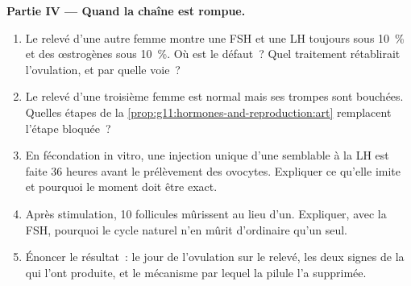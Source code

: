 \begin{problem}
\medskip
\noindent\textbf{Partie IV --- Quand la chaîne est rompue.}
\begin{enumerate}[resume]
  \item Le relevé d'une autre femme montre une FSH et une LH toujours
        sous 10~\% et des œstrogènes sous 10~\%. Où est le défaut~?
        Quel traitement rétablirait l'ovulation, et par quelle voie~?
  \item Le relevé d'une troisième femme est normal mais ses trompes
        sont bouchées. Quelles étapes de la
        \cref{prop:g11:hormones-and-reproduction:art} remplacent
        l'étape bloquée~?
  \item En fécondation in vitro, une injection unique d'une 
        semblable à la LH est faite 36 heures avant le prélèvement des
        ovocytes. Expliquer ce qu'elle imite et pourquoi le moment doit
        être exact.
  \item Après stimulation, 10 follicules mûrissent au lieu d'un.
        Expliquer, avec la FSH, pourquoi le cycle naturel n'en mûrit
        d'ordinaire qu'un seul.
  \item Énoncer le résultat~: le jour de l'ovulation sur le relevé, les
        deux signes de la  qui l'ont produite, et le
        mécanisme par lequel la pilule l'a supprimée.
\end{enumerate}
\end{problem}
